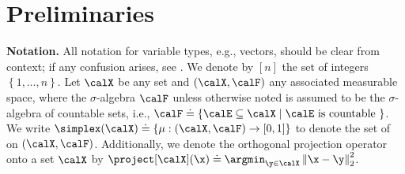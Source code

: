 \section{Preliminaries}
\vspace{-1em}
\textbf{Notation. } 
All notation for variable types, e.g., vectors, should be clear from context; if any confusion arises, see .
We denote 
by $[n]$ the set of integers $\left\{1, \hdots, n\right\}$.
%
Let $\calX$ be any set and $(\calX, \calF)$ any associated measurable space, where the $\sigma$-algebra $\calF$ unless otherwise noted is assumed to be the $\sigma$-algebra of countable sets, i.e., $\calF \doteq \{\calE \subseteq \calX \mid \calE \text{ is countable } \}$.
We write $\simplex(\calX) \doteq \{\mu: (\calX, \calF) \to [0, 1] \}$ to denote the set of   on $(\calX, \calF)$.
%
Additionally, we denote the orthogonal projection operator onto a set $\calX$ by $\project[\calX](\x) \doteq \argmin_{\y \in \calX} \left\|\x - \y \right\|_2^2$.
 


